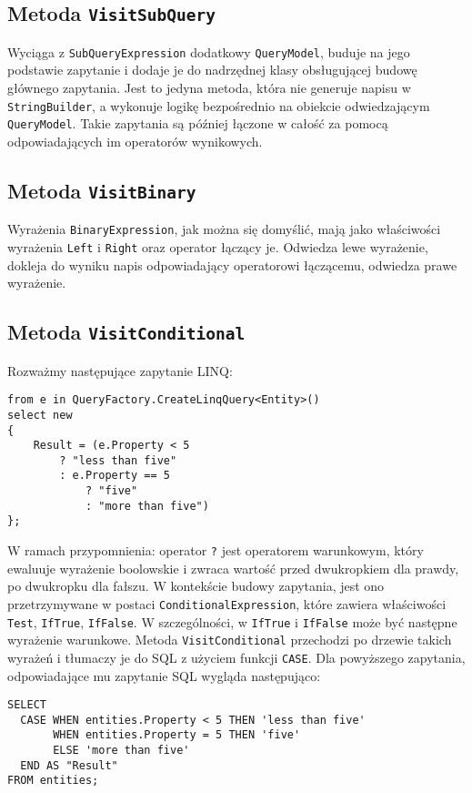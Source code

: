 \subsection{Metoda \texttt{VisitSubQuery}}
Wyciąga z \texttt{SubQueryExpression} dodatkowy \texttt{QueryModel}, buduje na jego podstawie zapytanie i dodaje je do nadrzędnej klasy obsługującej budowę głównego zapytania. Jest to jedyna metoda, która nie generuje napisu w \texttt{StringBuilder}, a wykonuje logikę bezpośrednio na obiekcie odwiedzającym \texttt{QueryModel}. Takie zapytania są później łączone w całość za pomocą odpowiadających im operatorów wynikowych.

\subsection{Metoda \texttt{VisitBinary}}
Wyrażenia \texttt{BinaryExpression}, jak można się domyślić, mają jako właściwości wyrażenia \texttt{Left} i \texttt{Right} oraz operator łączący je. Odwiedza lewe wyrażenie, dokleja do wyniku napis odpowiadający operatorowi łączącemu, odwiedza prawe wyrażenie.

\subsection{Metoda \texttt{VisitConditional}}
Rozważmy następujące zapytanie LINQ:

\begin{lstlisting}
from e in QueryFactory.CreateLinqQuery<Entity>()
select new
{
    Result = (e.Property < 5 
        ? "less than five"
        : e.Property == 5 
            ? "five"
            : "more than five")
};
\end{lstlisting}

W ramach przypomnienia: operator \texttt{?} jest operatorem warunkowym, który ewaluuje wyrażenie boolowskie i zwraca wartość przed dwukropkiem dla prawdy, po dwukropku dla fałszu. W kontekście budowy zapytania, jest ono przetrzymywane w postaci \texttt{ConditionalExpression}, które zawiera właściwości \texttt{Test}, \texttt{IfTrue}, \texttt{IfFalse}. W szczególności, w \texttt{IfTrue} i \texttt{IfFalse} może być następne wyrażenie warunkowe. Metoda \texttt{VisitConditional} przechodzi po drzewie takich wyrażeń i tłumaczy je do SQL z użyciem funkcji \texttt{CASE}. Dla powyższego zapytania, odpowiadające mu zapytanie SQL wygląda następująco:

\begin{lstlisting}
SELECT
  CASE WHEN entities.Property < 5 THEN 'less than five'
       WHEN entities.Property = 5 THEN 'five'
       ELSE 'more than five'
  END AS "Result"
FROM entities;
\end{lstlisting}

